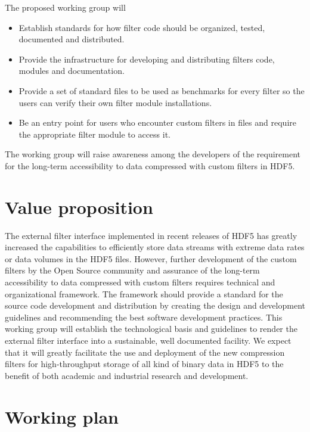 \documentclass{scrartcl}
\begin{document}
The proposed working group will 
\begin{itemize}
    \item Establish standards for how filter code should be organized, tested,
        documented and distributed. 
    \item Provide the infrastructure for developing and distributing  filters
        code, modules and documentation.
    \item Provide a set of standard files to be used as benchmarks for every
        filter so the users can verify their own filter module installations. 
    \item Be an entry point for users who encounter custom filters in files and
        require the appropriate filter module to access it. 
\end{itemize}
The working group will raise awareness among the developers of the requirement for the long-term accessibility to data compressed with custom filters in HDF5. 

\section{Value proposition}
The external filter interface implemented in recent releases of HDF5 has greatly
increased the capabilities to efficiently store data streams with extreme data
rates or data volumes in the HDF5 files.  However, further development of the custom filters by the Open Source community and assurance of the
long-term accessibility to data compressed with custom filters requires technical and
organizational framework. The framework should provide a standard for the source code development and distribution by creating the design and development guidelines and recommending the best
software development practices. This working group will establish the technological basis and
guidelines to render the external filter interface into a sustainable, well
documented facility. We expect that it will greatly facilitate the use and
deployment of the new compression filters for high-throughput storage of all kind of
binary data in HDF5 to the benefit of both academic and industrial research and
development.

\section{Working plan}
\end{document}
